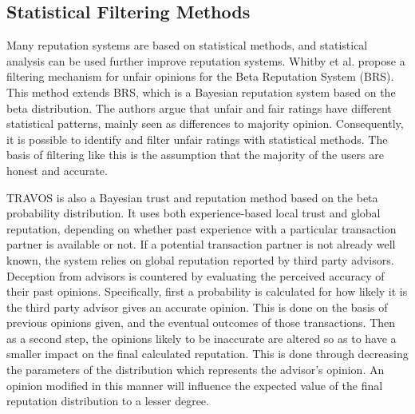 \documentclass[%
    ]{\PathToTumTemplate/thesis/tum_thesis}
\begin{document}





\subsection{Statistical Filtering Methods}

Many reputation systems are based on statistical methods, and statistical analysis can be used further improve reputation systems.
Whitby et al. propose a filtering mechanism for unfair opinions for the Beta Reputation System (BRS)\cite{whitby_filtering_2014}.
This method extends BRS, which is a Bayesian reputation system based on the beta distribution.
The authors argue that unfair and fair ratings have different statistical patterns, mainly seen as differences to majority opinion.
Consequently, it is possible to identify and filter unfair ratings with statistical methods.
The basis of filtering like this is the assumption that the majority of the users are honest and accurate.

TRAVOS is also a Bayesian trust and reputation method based on the beta probability distribution\cite{teacy_travos_2006}.
It uses both experience-based local trust and global reputation, depending on whether past experience with a particular transaction partner is available or not.
If a potential transaction partner is not already well known, the system relies on global reputation reported by third party advisors.
Deception from advisors is countered by evaluating the perceived accuracy of their past opinions.
Specifically, first a probability is calculated for how likely it is the third party advisor gives an accurate opinion.
This is done on the basis of previous opinions given, and the eventual outcomes of those transactions.
Then as a second step, the opinions likely to be inaccurate are altered so as to have a smaller impact on the final calculated reputation.
This is done through decreasing the parameters of the distribution which represents the advisor's opinion. An opinion modified in this manner will influence the expected value of the final reputation distribution to a lesser degree.
\end{document}
